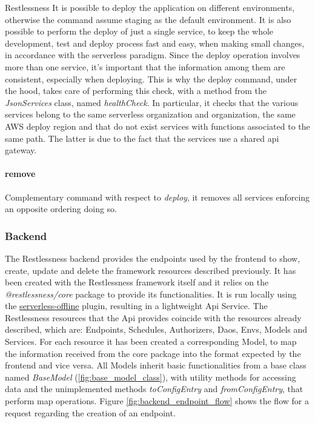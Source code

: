 \begin{chapter}{Restlessness}
    It is possible to deploy the application on different environments, otherwise
    the command assume staging as the default environment.
    It is also possible to perform the deploy of just a single service, to keep
    the whole development, test and deploy process fast and easy, when making small
    changes, in accordance with the serverless paradigm.
    Since the deploy operation involves more than one service, it's important that
    the information among them are consistent, especially when deploying. This is
    why the deploy command, under the hood, takes care of performing this check,
    with a method from the \textit{JsonServices} class, named \textit{healthCheck}.
    In particular, it checks that the various services belong to the same serverless
    organization and organization, the same AWS deploy region and that do not exist
    services with functions associated to the same path. The latter is due to the fact
    that the services use a shared api gateway.

    \paragraph{remove}
    Complementary command with respect to \textit{deploy}, it removes all services
    enforcing an opposite ordering doing so.

    \subsubsection{Backend}
    The Restlessness backend provides the endpoints used by the frontend to show,
    create, update and delete the framework resources described previously.
    It has been created with the Restlessness framework itself and it relies on
    the \mbox{\textit{@restlessness/core}} package to provide its functionalities.
    It is run locally using the
    \href{https://www.npmjs.com/package/serverless-offline}{serverless-offline}
    plugin, resulting in a lightweight Api Service.
    The Restlessness resources that the Api provides coincide with the resources
    already described, which are: Endpoints, Schedules, Authorizers, Daos, Envs,
    Models and Services.
    For each resource it has been created a corresponding Model, to map the information
    received from the core package into the format expected by the frontend and
    vice versa. All Models inherit basic functionalities from a base class named
    \textit{BaseModel} (\ref{fig:base_model_class}), with utility methods for
    accessing data and the unimplemented methods \textit{toConfigEntry} and
    \textit{fromConfigEntry}, that perform map operations.
    Figure \ref{fig:backend_endpoint_flow} shows the flow for a request regarding
    the creation of an endpoint.


\end{chapter}
